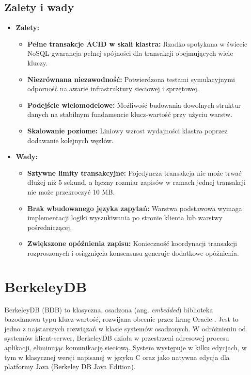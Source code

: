 \subsection{Zalety i wady}
\begin{itemize}
    \item \textbf{Zalety:}
    \begin{itemize}
        \item \textbf{Pełne transakcje ACID w skali klastra:} Rzadko spotykana w świecie NoSQL gwarancja pełnej spójności dla transakcji obejmujących wiele kluczy.
        \item \textbf{Niezrównana niezawodność:} Potwierdzona testami symulacyjnymi odporność na awarie infrastruktury sieciowej i sprzętowej.
        \item \textbf{Podejście wielomodelowe:} Możliwość budowania dowolnych struktur danych na stabilnym fundamencie klucz-wartość przy użyciu warstw.
        \item \textbf{Skalowanie poziome:} Liniowy wzrost wydajności klastra poprzez dodawanie kolejnych węzłów.
    \end{itemize}
    \item \textbf{Wady:}
    \begin{itemize}
        \item \textbf{Sztywne limity transakcyjne:} Pojedyncza transakcja nie może trwać dłużej niż 5 sekund, a łączny rozmiar zapisów w ramach jednej transakcji nie może przekroczyć 10 MB.
        \item \textbf{Brak wbudowanego języka zapytań:} Warstwa podstawowa wymaga implementacji logiki wyszukiwania po stronie klienta lub warstwy pośredniczącej.
        \item \textbf{Zwiększone opóźnienia zapisu:} Konieczność koordynacji transakcji rozproszonych i osiągnięcia konsensusu generuje dodatkowe opóźnienia.
    \end{itemize}
\end{itemize}

\section{BerkeleyDB}
BerkeleyDB (BDB) to klasyczna, osadzona (ang. \emph{embedded}) biblioteka bazodanowa typu klucz-wartość, rozwijana obecnie przez firmę Oracle \cite{olson1999}. Jest to jedno z najstarszych rozwiązań w klasie systemów osadzonych. W odróżnieniu od systemów klient-serwer, BerkeleyDB działa w przestrzeni adresowej procesu aplikacji, eliminując komunikację sieciową. System występuje w kilku edycjach, w tym w klasycznej wersji napisanej w języku C oraz jako natywna edycja dla platformy Java (Berkeley DB Java Edition).

